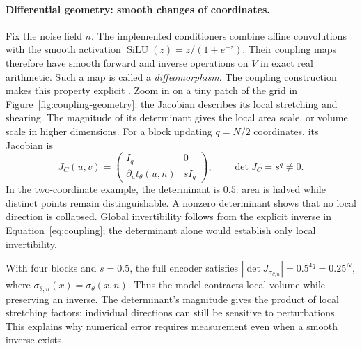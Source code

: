 \documentclass[10pt]{article}
\begin{document}
\paragraph{Differential geometry: smooth changes of coordinates.}
Fix the noise field $n$. The implemented conditioners combine affine
convolutions with the smooth activation $\operatorname{SiLU}(z)=z/(1+e^{-z})$.
Their coupling maps therefore have smooth forward and inverse operations on
$V$ in exact real arithmetic. Such a map is called a \emph{diffeomorphism}.
The coupling construction makes this property explicit \cite{realnvp}.
Zoom in on a tiny patch of the grid in Figure~\ref{fig:coupling-geometry}:
the Jacobian describes its local stretching and shearing. The magnitude of its
determinant gives the local area scale, or volume scale in higher dimensions.
For a block updating $q=N/2$ coordinates, its Jacobian is
\begin{equation}
 J_C(u,v)=
 \begin{pmatrix}
 I_q & 0\\
 \partial_u t_\theta(u,n) & sI_q
 \end{pmatrix},\qquad \det J_C=s^q\ne0.
 \label{eq:coupling-jacobian}
\end{equation}
In the two-coordinate example, the determinant is $0.5$: area is halved while
distinct points remain distinguishable. A nonzero determinant shows that no
local direction is collapsed. Global invertibility
follows from the explicit inverse in Equation~\ref{eq:coupling}; the determinant
alone would establish only local invertibility.

With four blocks and $s=0.5$, the full encoder satisfies
$|\det J_{\sigma_{\theta,n}}|=0.5^{4q}=0.25^N$, where
$\sigma_{\theta,n}(x)=\sigma_\theta(x,n)$. Thus the model contracts local volume while
preserving an inverse. The determinant's magnitude gives the product of local stretching
factors; individual directions can still be sensitive to perturbations. This
explains why numerical error requires measurement even when a smooth inverse
exists.
\end{document}
